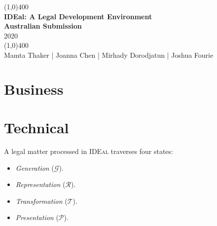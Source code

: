 \documentclass{article}
\date{\today}
\numberwithin{equation}{section}
\newcommand{\ideal}{\textsc{IDEal }}
\begin{document}
	\pagecolor{IdealColour}

	\begin{titlepage}
	\begin{center}
		\color{white}
		\vfill
		\line(1,0){400}\\[1mm]
			\huge{\textbf{IDEal: A Legal Development Environment}}\\
			\Large{\textbf{Australian Submission}}\\
			2020 \\
		\line(1,0){400}\\[3mm]
		\vfill
		\large{Mamta Thaker | Joanna Chen | Mirhady Dorodjatun | Joshua Fourie}
	\end{center}
	\end{titlepage}

	\pagecolor{white}

	\tableofcontents
	\thispagestyle{empty}
	\clearpage

\part{Business}



\pagebreak
\part{Technical}

A legal matter processed in \ideal traverses four states:
\begin{itemize}
	\item \textit{Generation} ($\mathcal{G}$). 
	\item \textit{Representation} ($\mathcal{R}$).
	\item \textit{Transformation} ($\mathcal{T}$). 
	\item \textit{Presentation} ($\mathcal{P}$).
\end{itemize}
	
\end{document}
